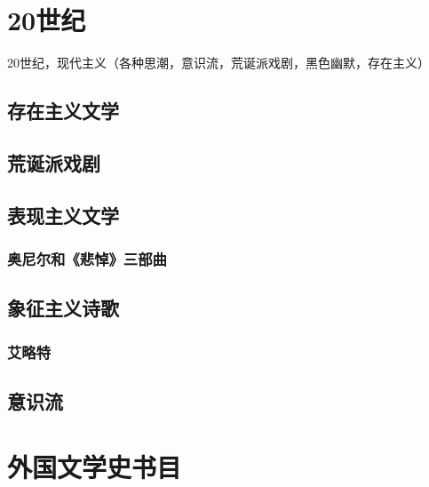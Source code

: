 \documentclass[UTF8]{../RepresentationUniverse}
\begin{document}
\chapter{20世纪}


20世纪，现代主义（各种思潮，意识流，荒诞派戏剧，黑色幽默，存在主义）



\section{存在主义文学}


\section{荒诞派戏剧}



\section{表现主义文学}

\subsection{奥尼尔和《悲悼》三部曲}



\section{象征主义诗歌}
\subsection{艾略特}




\section{意识流}




\chapter{外国文学史书目}
\end{document}
